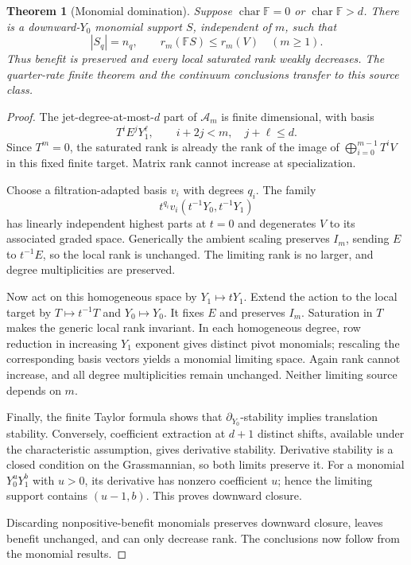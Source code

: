 \documentclass[11pt]{article}
\newtheorem{theorem}{Theorem}[section]
\theoremstyle{remark}\newtheorem{remark}[theorem]{Remark}
\begin{document}
\begin{theorem}[Monomial domination]\label{thm:degeneration}
Suppose $\operatorname{char}\mathbb F=0$ or $\operatorname{char}\mathbb F>d$. There is a downward-$Y_0$ monomial support $S$, independent of $m$, such that
\[
 |S_q|=n_q,\qquad r_m(\mathbb F S)\le r_m(V)\quad(m\ge1).
\]
Thus benefit is preserved and every local saturated rank weakly decreases. The quarter-rate finite theorem and the continuum conclusions transfer to this source class.
\end{theorem}
\begin{proof}
The jet-degree-at-most-$d$ part of $\mathcal A_m$ is finite dimensional, with basis
\[
 T^iE^jY_1^\ell,\qquad i+2j<m,\quad j+\ell\le d.
\]
Since $T^m=0$, the saturated rank is already the rank of the image of $\bigoplus_{i=0}^{m-1}T^iV$ in this fixed finite target. Matrix rank cannot increase at specialization.

Choose a filtration-adapted basis $v_i$ with degrees $q_i$. The family
\[
 t^{q_i}v_i(t^{-1}Y_0,t^{-1}Y_1)
\]
has linearly independent highest parts at $t=0$ and degenerates $V$ to its associated graded space. Generically the ambient scaling preserves $I_m$, sending $E$ to $t^{-1}E$, so the local rank is unchanged. The limiting rank is no larger, and degree multiplicities are preserved.

Now act on this homogeneous space by $Y_1\mapsto tY_1$. Extend the action to the local target by $T\mapsto t^{-1}T$ and $Y_0\mapsto Y_0$. It fixes $E$ and preserves $I_m$. Saturation in $T$ makes the generic local rank invariant. In each homogeneous degree, row reduction in increasing $Y_1$ exponent gives distinct pivot monomials; rescaling the corresponding basis vectors yields a monomial limiting space. Again rank cannot increase, and all degree multiplicities remain unchanged. Neither limiting source depends on $m$.

Finally, the finite Taylor formula shows that $\partial_{Y_0}$-stability implies translation stability. Conversely, coefficient extraction at $d+1$ distinct shifts, available under the characteristic assumption, gives derivative stability. Derivative stability is a closed condition on the Grassmannian, so both limits preserve it. For a monomial $Y_0^uY_1^b$ with $u>0$, its derivative has nonzero coefficient $u$; hence the limiting support contains $(u-1,b)$. This proves downward closure.

Discarding nonpositive-benefit monomials preserves downward closure, leaves benefit unchanged, and can only decrease rank. The conclusions now follow from the monomial results.
\end{proof}
\end{document}
